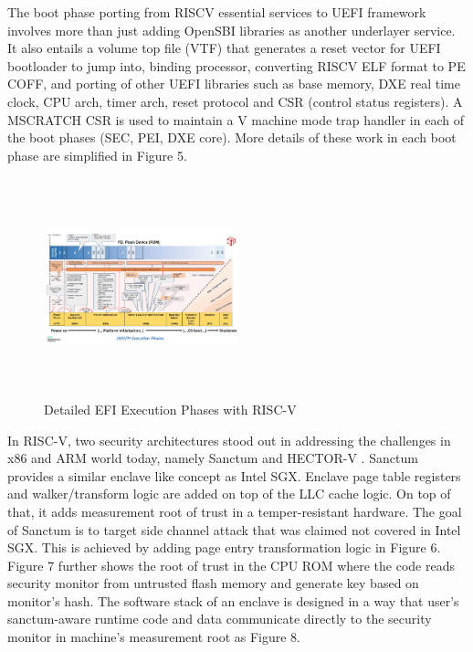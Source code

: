 \documentclass[a4paper,fleqn]{cas-dc}
\begin{document}
The boot phase porting from RISCV essential services to UEFI framework involves more than just adding OpenSBI libraries as another underlayer service. It also entails a volume top file (VTF) that generates a reset vector for UEFI bootloader to jump into, binding processor, converting RISCV ELF format to PE COFF, and porting of other UEFI libraries such as base memory, DXE real time clock, CPU arch, timer arch, reset protocol and CSR (control status registers). A MSCRATCH CSR is used to maintain a V machine mode trap handler in each of the boot phases (SEC, PEI, DXE core). More details of these work in each boot phase are simplified in Figure 5.

\begin{figure}[hbt!]
	\centering
	\includegraphics[width=0.5\textwidth,height=2.5in]{figs/RiscVDetailedEfiFlow.JPG}
	\caption{Detailed EFI Execution Phases with RISC-V \cite{R51:2}}
\end{figure}

In RISC-V, two security architectures stood out in addressing the challenges in x86 and ARM world today, namely Sanctum \cite{R5:6} and HECTOR-V \cite{R5:5}. Sanctum provides a similar enclave like concept as Intel SGX. Enclave page table registers and walker/transform logic are added on top of the LLC cache logic. On top of that, it adds measurement root of trust in a temper-resistant hardware. The goal of Sanctum is to target side channel attack that was claimed not covered in Intel SGX. This is achieved by adding page entry transformation logic in Figure 6. Figure 7 further shows the root of trust in the CPU ROM where the code reads security monitor from untrusted flash memory and generate key based on monitor’s hash. The software stack of an enclave is designed in a way that user’s sanctum-aware runtime code and data communicate directly to the security monitor in machine’s measurement root as Figure 8.
\end{document}
